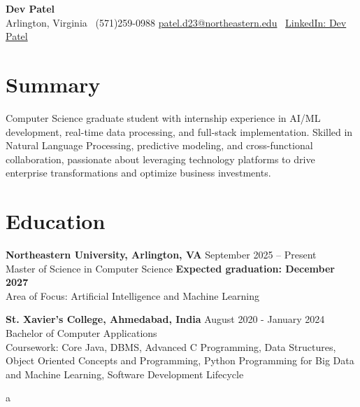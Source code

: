 \documentclass[a4paper,10pt]{article}
\begin{document}
\begin{center}
\vspace{-3mm}
    \fontsize{16}{18}\selectfont \textbf{Dev Patel} \\
    \vspace{0mm}
    \normalsize Arlington, Virginia \textbar\ (571)259-0988  \textbar       \href{mailto:patel.d23@northeastern.edu}{patel.d23@northeastern.edu} \textbar\ \href{https://www.linkedin.com/in/devxpatel//}{LinkedIn: Dev Patel} \\
\end{center}



\section*{Summary}
Computer Science graduate student with internship experience in AI/ML development, real-time data processing, and full-stack implementation. Skilled in Natural Language Processing, predictive modeling, and cross-functional collaboration, passionate about leveraging technology platforms to drive enterprise transformations and optimize business investments.
 
\vspace{ 0 mm}
\section*{Education}
\textbf{Northeastern University, Arlington, VA} \hfill September 2025 -- Present\\
Master of Science in Computer Science \hfill \textbf{Expected graduation: December 2027} \\
Area of Focus: Artificial Intelligence and Machine Learning

\vspace{1 mm} %
\textbf{St. Xavier's College, Ahmedabad, India} \hfill August 2020 - January 2024 \\
Bachelor of Computer Applications\\
Coursework: Core Java, DBMS, Advanced C Programming, Data Structures, Object Oriented Concepts and Programming, Python Programming for Big Data and Machine Learning, Software Development Lifecycle

a
\end{document}
